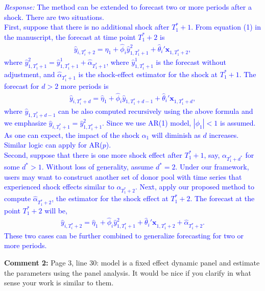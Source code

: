 \documentclass[12pt]{article}
\newcommand{\response}[1]{\noindent \textcolor{blue}{\emph{Response:} #1}}
\begin{document}
\response{The method can be extended to forecast two or more periods after a shock. There are two situations.  \\

First, suppose that there is no additional shock after $T_1^* + 1$. From equation (1) in the manuscript, the forecast at time point $T_1^*+2$ is
\begin{align*}
 \hat{y}_{i, T_i^* + 2} = \hat{\eta}_1 + \hat{\phi}_i \hat{y}_{1, T_1^*+1}^{2} + \hat{\theta}_i'\mathbf{x}_{1, T_1^*+2}, \tag{*}
\end{align*}
where $\hat{y}_{1, T_1^*+1}^{2}=\hat{y}_{1, T_1^*+1}^{1} + \hat{\alpha}_{T_1^* + 1}$, where $\hat{y}_{1, T_1^*+1}^{1}$ is the forecast without adjustment, and  $\hat{\alpha}_{T_1^* + 1}$ is the shock-effect estimator for the shock at $T_1^*+1$. The forecast for $d>2$ more periods is
\begin{align*}
 \hat{y}_{i, T_i^* + d} = \hat{\eta}_1 + \hat{\phi}_i \hat{y}_{1, T_1^*+d-1}+ \hat{\theta}_i'\mathbf{x}_{1, T_1^*+d},
\end{align*}
where $\hat{y}_{1, T_1^*+d-1}$ can be also computed recursively using the above formula and we  emphasize  $ \hat{y}_{i, T_i^* + 1}=\hat{y}_{1, T_1^*+1}^{2}$. Since we use AR(1) model, $|\phi_1 |< 1$ is assumed.  As one can expect, the impact of the shock  $\alpha_1$ will diminish as $d$ increases. Similar logic can apply for AR($p$). \\

Second, suppose that  there is one more shock effect after $T_1^*+1$, say, $\alpha_{T_1^* + d^*}$ for some $d^* > 1$. Without loss of generality, assume $d^* = 2$. Under our framework, users may want to construct another set of donor pool with time series that experienced shock effects similar to $\alpha_{T_1^* + 2}$. Next,  apply our proposed method to compute $\hat{\alpha}_{T_1^* + 2}$, the estimator for the shock effect at $T_1^* +2$. The forecast at the point $T_1^* + 2$ will be,  
\begin{align*}
 \hat{y}_{i, T_i^* + 2} = \hat{\eta}_1 + \hat{\phi}_i \hat{y}_{1, T_1^*+1}^{2} + \hat{\theta}_i'\mathbf{x}_{1, T_1^*+2} + \hat{\alpha}_{T_1^* + 2}.
\end{align*}
These two cases can be further combined to generalize forecasting for two or more periods. \\
}

{\bf Comment 2:} Page 3, line 30: \citet{blundell1998initial} model is a fixed effect dynamic panel and estimate the parameters using the panel analysis. It would be nice if you clarify in what sense your work is similar to them. \\
\end{document}
